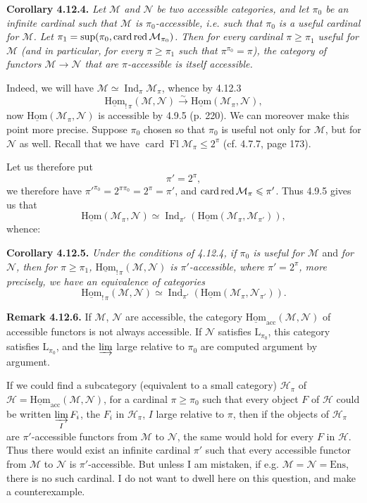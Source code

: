 \documentclass[11pt]{article}
\newcommand{\printedpage}[1]{\marginpar{\footnotesize p.~#1}}
\newcommand{\msp}[1]{\marginpar{\footnotesize [#1]}}
\newcommand{\M}{\mathcal{M}}
\newcommand{\N}{\mathcal{N}}
\newcommand{\cH}{\mathcal{H}}
\newcommand{\Hom}{\underline{\mathrm{Hom}}}
\newcommand{\Ind}{\operatorname{Ind}}
\newcommand{\Fl}{\operatorname{Fl}}
\newcommand{\card}{\operatorname{card}}
\newcommand{\red}{\mathop{\textup{red}}\nolimits}
\begin{document}
\printedpage{104}
\msp{page 278}
\textbf{Corollary 4.12.4.} \textit{Let $\M$ and $\N$ be two accessible categories, and let $\pi_0$ be an infinite cardinal such that $\M$ is $\pi_0$-accessible, i.e. such that $\pi_0$ is a useful cardinal for $\M$. Let $\pi_1 = \sup(\pi_0,\allowbreak \card\red\M_{\pi_0})$. Then for every cardinal $\pi \geqslant \pi_1$ useful for $\M$ (and in particular, for every $\pi \geqslant \pi_1$ such that $\pi^{\pi_0} = \pi$), the category of functors $\M \longrightarrow \N$ that are $\pi$-accessible is itself accessible.}

Indeed, we will have $\M \simeq \Ind_\pi\M_\pi$, whence by 4.12.3
\[
\Hom_{!\,\pi}(\M,\N) \xrightarrow{\sim} \Hom(\M_\pi,\N) ,
\]
now $\Hom(\M_\pi,\N)$ is accessible by 4.9.5 (p. 220). We can moreover make this point more precise. Suppose $\pi_0$ chosen so that $\pi_0$ is useful not only for $\M$, but for $\N$ as well. Recall that we have $\card\Fl\M_\pi \leqslant 2^\pi$ (cf. 4.7.7, page 173).

\msp{page 279}
Let us therefore put
\[
\pi' = 2^\pi ,
\]
we therefore have $\pi'^{\pi_0} = 2^{\pi\pi_0} = 2^\pi = \pi'$, and $\card\red\M_\pi \leqslant \pi'$. Thus 4.9.5 gives us that
\[
\Hom(\M_\pi,\N) \simeq \Ind_{\pi'}(\Hom(\M_\pi,\M_{\pi'})) , %
\]
whence:

\textbf{Corollary 4.12.5.} \textit{Under the conditions of 4.12.4, if $\pi_0$ is useful for $\M$} and \textit{for $\N$, then for $\pi \geqslant \pi_1$, $\Hom_{!\,\pi}(\M,\N)$ is $\pi'$-accessible, where $\pi' = 2^\pi$, more precisely, we have an equivalence of categories}
\[
\Hom_{!\,\pi}(\M,\N) \simeq \Ind_{\pi'}(\Hom(\M_\pi,\N_{\pi'})) .
\]

\textbf{Remark 4.12.6.} If $\M$, $\N$ are accessible, the category $\Hom_{\mathrm{acc}}(\M,\N)$ of accessible functors is not always accessible. If $\N$ satisfies $\mathrm{L}_{\pi_0}$, this category satisfies $\mathrm{L}_{\pi_0}$, %
and the $\varinjlim$ large relative to $\pi_0$ are computed argument by argument.

\msp{page 280}
If we could find a subcategory (equivalent to a small category) $\cH_\pi$ of $\cH = \Hom_{\mathrm{acc}}(\M,\N)$, for a cardinal $\pi \geqslant \pi_0$ such that every object $F$ of $\cH$ could be written $\varinjlim\limits_{I} F_i$, the $F_i$ in $\cH_\pi$, $I$ large relative to $\pi$, then if the objects of $\cH_\pi$ are $\pi'$-accessible functors from $\M$ to $\N$, the same would hold for every $F$ in $\cH$. Thus there would exist an infinite cardinal $\pi'$ such that every accessible functor from $\M$ to $\N$ is $\pi'$-accessible. But unless I am mistaken, if e.g. $\M = \N = \mathrm{Ens}$, there is no such cardinal. I do not want to dwell here on this question, and make a counterexample.
\end{document}
